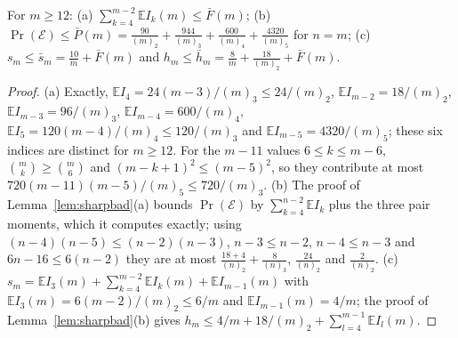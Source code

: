\begin{lemma}\label{lem:intref}
For $m\ge12$: (a) $\sum_{k=4}^{m-2}\mathbb EI_k(m)\le\bar F(m)$; (b) $\Pr(\mathcal E)\le\bar P(m)=\frac{90}{(m)_2}+\frac{944}{(m)_3}+\frac{600}{(m)_4}+\frac{4320}{(m)_5}$ for $n=m$; (c) $s_m\le\bar s_m=\frac{10}m+\bar F(m)$ and $h_m\le\bar h_m=\frac8m+\frac{18}{(m)_2}+\bar F(m)$. 
\end{lemma}

\begin{proof}
(a) Exactly, $\mathbb EI_4=24(m-3)/(m)_3\le24/(m)_2$, $\mathbb EI_{m-2}=18/(m)_2$, $\mathbb EI_{m-3}=96/(m)_3$, $\mathbb EI_{m-4}=600/(m)_4$, $\mathbb EI_5=120(m-4)/(m)_4\le120/(m)_3$ and $\mathbb EI_{m-5}=4320/(m)_5$; these six indices are distinct for $m\ge12$. For the $m-11$ values $6\le k\le m-6$, $\binom mk\ge\binom m6$ and $(m-k+1)^2\le(m-5)^2$, so they contribute at most $720(m-11)(m-5)/(m)_5\le720/(m)_3$. (b) The proof of Lemma~\ref{lem:sharpbad}(a) bounds $\Pr(\mathcal E)$ by $\sum_{k=4}^{n-2}\mathbb EI_k$ plus the three pair moments, which it computes exactly; using $(n-4)(n-5)\le(n-2)(n-3)$, $n-3\le n-2$, $n-4\le n-3$ and $6n-16\le6(n-2)$ they are at most $\frac{18+4}{(n)_2}+\frac8{(n)_3}$, $\frac{24}{(n)_2}$ and $\frac2{(n)_2}$. (c) $s_m=\mathbb EI_3(m)+\sum_{k=4}^{m-2}\mathbb EI_k(m)+\mathbb EI_{m-1}(m)$ with $\mathbb EI_3(m)=6(m-2)/(m)_2\le6/m$ and $\mathbb EI_{m-1}(m)=4/m$; the proof of Lemma~\ref{lem:sharpbad}(b) gives $h_m\le4/m+18/(m)_2+\sum_{l=4}^{m-1}\mathbb EI_l(m)$.
\end{proof}

